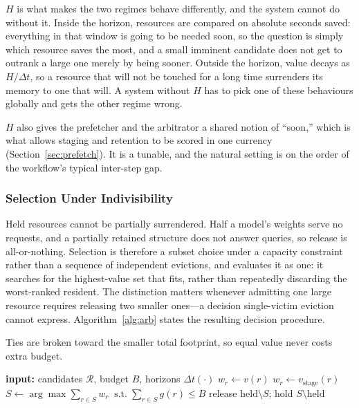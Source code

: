$H$ is what makes the two regimes behave differently, and the system cannot do
without it. Inside the horizon, resources are compared on absolute seconds
saved: everything in that window is going to be needed soon, so the question is
simply which resource saves the most, and a small imminent candidate does not
get to outrank a large one merely by being sooner. Outside the horizon, value
decays as $H/\Delta t$, so a resource that will not be touched for a long time
surrenders its memory to one that will. A system without $H$ has to pick one
of these behaviours globally and gets the other regime wrong.

$H$ also gives the prefetcher and the arbitrator a shared notion of ``soon,''
which is what allows staging and retention to be scored in one currency
(Section~\ref{sec:prefetch}). It is a tunable, and the natural setting is on
the order of the workflow's typical inter-step gap.

\subsubsection{Selection Under Indivisibility}

Held resources cannot be partially surrendered. Half a model's weights serve
no requests, and a partially retained structure does not answer queries, so
release is all-or-nothing. Selection is therefore a subset choice under a
capacity constraint rather than a sequence of independent evictions, and
\sysname evaluates it as one: it searches for the highest-value set that fits,
rather than repeatedly discarding the worst-ranked resident. The distinction
matters whenever admitting one large resource requires releasing two smaller
ones---a decision single-victim eviction cannot express.
Algorithm~\ref{alg:arb} states the resulting decision procedure.

Ties are broken toward the smaller total footprint, so equal value never costs
extra budget.

\begin{algorithm}[t]
\small
\caption{Residency decision}
\label{alg:arb}
\begin{algorithmic}[1]
\State \textbf{input:} candidates $\mathcal{R}$, budget $B$, horizons $\Delta t(\cdot)$
  \State $w_r \gets v(r)$ 
\EndFor
{}
  \State $w_r \gets v_{\text{stage}}(r)$ 
\EndFor
\State $S \gets \arg\max \sum_{r \in S} w_r \;\;\text{s.t.}\; \sum_{r \in S} g(r) \le B$
\State release $\mathrm{held} \setminus S$; hold $S \setminus \mathrm{held}$
\end{algorithmic}
\end{algorithm}


